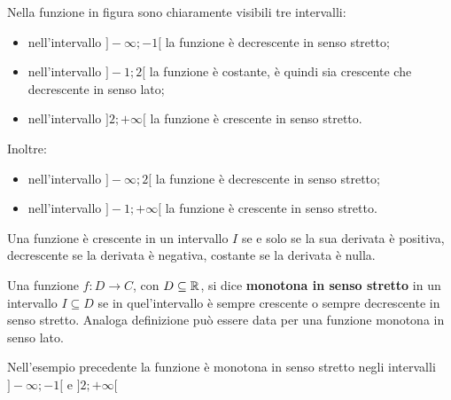 \documentclass{article}     %
\begin{document}
        Nella funzione in figura sono chiaramente visibili tre intervalli: 
        \begin{itemize}
            \item nell'intervallo $]-\infty;-1[$ la funzione è decrescente in senso stretto;
            \item nell'intervallo $]-1;2[$ la funzione è costante, è quindi sia crescente che decrescente in senso lato;
            \item nell'intervallo $]2;+\infty[$ la funzione è crescente in senso stretto.
        \end{itemize}
        Inoltre:
        \begin{itemize}
            \item nell'intervallo $]-\infty;2[$ la funzione è decrescente in senso stretto;
            \item nell'intervallo $]-1;+\infty[$ la funzione è crescente in senso stretto.
        \end{itemize}

        Una funzione è crescente in un intervallo $I$ se e solo se la sua derivata è positiva, decrescente se la derivata è negativa, costante se la derivata è nulla. 
        \begin{definition}
            Una funzione $f:D\rightarrow C$, con $D\subseteq\mathbb{R}$, si dice \textbf{monotona in senso stretto} in un intervallo $I\subseteq D$ se in quel'intervallo è sempre crescente o sempre decrescente in senso stretto. Analoga definizione può essere data per una funzione monotona in senso lato. 
        \end{definition}
        Nell'esempio precedente la funzione è monotona in senso stretto negli intervalli $]-\infty;-1[$ e $]2;+\infty[$
\end{document}
